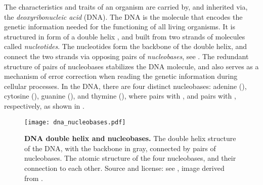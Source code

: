 
The characteristics and traits of an organism are carried by, and inherited via, the \emph{deoxyribonucleic acid} (DNA).
The \ac{DNA} is the molecule that encodes the genetic information needed for the functioning of all living organisms.
It is structured in form of a double helix \cite{Watson1953},
and built from two strands of molecules called \emph{nucleotides}.
The nucleotides form the backbone of the double helix,
and connect the two strands via opposing pairs of \emph{nucleobases}, see .
The redundant structure of pairs of nucleobases stabilizes the \ac{DNA} molecule,
and also serves as a mechanism of error correction when reading the genetic information during cellular processes.
In the \ac{DNA}, there are four distinct nucleobases:
adenine (), cytosine (), guanine (), and thymine (),
where  pairs with , and  pairs with , respectively,
as shown in .

\begin{figure}[hpbt]
    \centering
    \texttt{[image: dna\_nucleobases.pdf]}
    \begin{subfigure}{0pt}
        \label{fig:dna_nucleobases:sub:dna_helix}
    \end{subfigure}
    \begin{subfigure}{0pt}
        \label{fig:dna_nucleobases:sub:nucleobases}
    \end{subfigure}
    \caption[DNA double helix and nucleobases]{
        \textbf{DNA double helix and nucleobases.}
        The double helix structure of the DNA, with the backbone in gray,
        connected by pairs of nucleobases.
        The atomic structure of the four nucleobases, and their connection to each other.
        Source and license: see \cite{Czech2018DNA},
        image derived from \cite{MesserWoland2006,Sponk2010,Yikrazuul2008a,Yikrazuul2008b}.
    }
    \label{fig:dna_nucleobases}
\end{figure}

